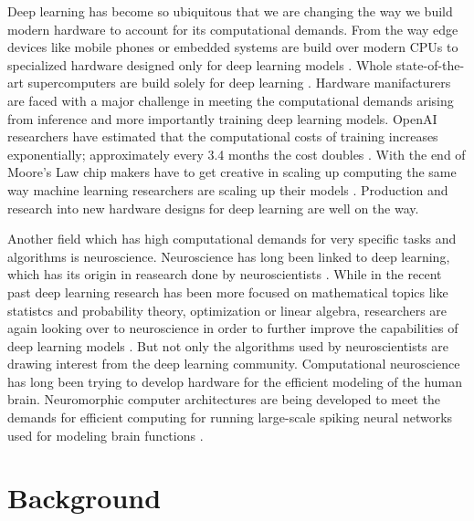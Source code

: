 \documentclass[]{article}
\begin{document}
Deep learning has become so ubiquitous that we are changing the
way we build modern hardware to account for its computational demands.
From the way edge devices like mobile phones or embedded systems are
build over modern CPUs to specialized hardware designed only for deep
learning models \citep{deng_2019, boitano_2020, perez_2017,
  jouppi_et_al_2017}.
Whole state-of-the-art supercomputers are build solely for deep
learning \citep{langston_2020}.
Hardware manifacturers are faced with a major challenge in meeting the
computational demands arising from inference and more importantly
training deep learning models.
OpenAI researchers have estimated that the computational costs of
training increases exponentially; approximately every 3.4 months the
cost doubles \citep{amodei_et_al_2019}.
With the end of Moore's Law chip makers have to get creative in
scaling up computing the same way machine learning researchers are
scaling up their models \citep{simonite_2016}.
Production and research into new hardware designs for deep learning
are well on the way.

Another field which has high computational demands for very specific
tasks and algorithms is neuroscience.
Neuroscience has long been linked to deep learning, which has its
origin in reasearch done by neuroscientists
\citep{mcculloch_et_al_1943}.
While in the recent past deep learning research has been more focused
on mathematical topics like statistcs and probability theory,
optimization or linear algebra, researchers are again looking over to
neuroscience in order to further improve the capabilities of deep
learning models \citep{marblestone_et_al_2016}.
But not only the algorithms used by neuroscientists are drawing
interest from the deep learning community.
Computational neuroscience has long been trying to develop hardware
for the efficient modeling of the human brain.
Neuromorphic computer architectures are being developed to meet the
demands for efficient computing for running large-scale spiking neural
networks used for modeling brain functions \citep{furber}.





\section{Background}
\end{document}
